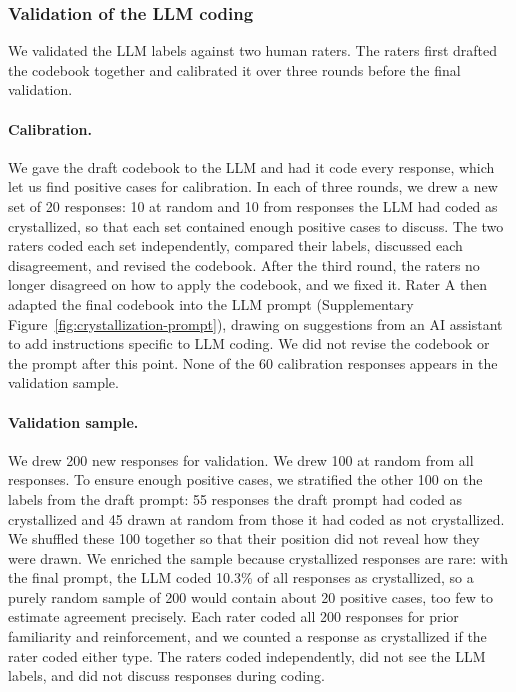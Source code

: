 \documentclass[11pt]{article}
\begin{document}


\subsubsection{Validation of the LLM coding}
\label{sec:si-crystallization-validation}


We validated the LLM labels against two human raters. The raters first drafted the codebook together and calibrated it over three rounds before the final validation.


\paragraph{Calibration.} We gave the draft codebook to the LLM and had it code every response, which let us find positive cases for calibration. In each of three rounds, we drew a new set of 20 responses: 10 at random and 10 from responses the LLM had coded as crystallized, so that each set contained enough positive cases to discuss. The two raters coded each set independently, compared their labels, discussed each disagreement, and revised the codebook. After the third round, the raters no longer disagreed on how to apply the codebook, and we fixed it. Rater A then adapted the final codebook into the LLM prompt (Supplementary Figure~\ref{fig:crystallization-prompt}), drawing on suggestions from an AI assistant to add instructions specific to LLM coding. We did not revise the codebook or the prompt after this point. None of the 60 calibration responses appears in the validation sample.

\paragraph{Validation sample.} We drew 200 new responses for validation. We drew 100 at random from all responses. To ensure enough positive cases, we stratified the other 100 on the labels from the draft prompt: 55 responses the draft prompt had coded as crystallized and 45 drawn at random from those it had coded as not crystallized. We shuffled these 100 together so that their position did not reveal how they were drawn. We enriched the sample because crystallized responses are rare: with the final prompt, the LLM coded 10.3\% of all responses as crystallized, so a purely random sample of 200 would contain about 20 positive cases, too few to estimate agreement precisely. Each rater coded all 200 responses for prior familiarity and reinforcement, and we counted a response as crystallized if the rater coded either type. The raters coded independently, did not see the LLM labels, and did not discuss responses during coding.
\end{document}
